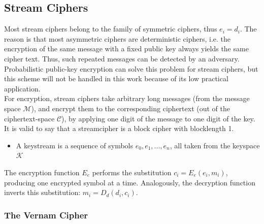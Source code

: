 \subsection{Stream Ciphers}
Most stream ciphers belong to the family of symmetric ciphers, thus $e_i = d_i$. The reason is that most asymmetric ciphers are deterministic ciphers,
i.e. the encryption of the same message with a fixed public key always yields the same cipher text. Thus, such repeated messages can be detected by 
an adversary. 
Probabilistic public-key encryption can solve this problem for stream ciphers,
but this scheme will not be handled in this work because of its low practical application.
\\
For encryption, stream ciphers take arbitrary long messages (from the message space $\mathcal{M}$), and encrypt
them to the corresponding ciphertext (out of the ciphertext-space $\mathcal{C}$), by applying
one digit of the message to one digit of the key. It is valid to say that a streamcipher is a block cipher with blocklength 1.
\begin{itemize}
 \item A keystream is a sequence of symbols $e_0, e_1, ..., e_n$, all taken from the keyspace $\mathcal{K}$
\end{itemize}
The encryption function $E_e$ performs the substitution $c_i = E_e(e_i, m_i)$, producing one encrypted symbol at a time. Analogously,
the decryption function inverts this substitution: $m_i = D_d(d_i, c_i)$.

\subsubsection{The Vernam Cipher} 

